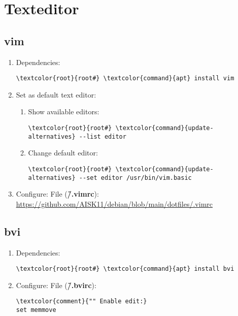 \documentclass[10pt, a4paper, onecolumn, openany]{book} %
\begin{document}
\section{Texteditor}
\subsection{vim}
\begin{enumerate}
    \item Dependencies:
\begin{Verbatim}[commandchars=\\\{\}]
\textcolor{root}{root#} \textcolor{command}{apt} install vim
\end{Verbatim}
    \item Set as default text editor:
    \begin{enumerate}
        \item Show available editors:
        \begin{Verbatim}[commandchars=\\\{\}]
\textcolor{root}{root#} \textcolor{command}{update-alternatives} --list editor
\end{Verbatim}
        \item Change default editor:
\begin{Verbatim}[commandchars=\\\{\}]
\textcolor{root}{root#} \textcolor{command}{update-alternatives} --set editor /usr/bin/vim.basic
\end{Verbatim}
    \end{enumerate}
    \item Configure:
\newline File (\textbf{\textcolor{file}{\~/.vimrc}}):
\newline \underline{\url{https://github.com/AISK11/debian/blob/main/dotfiles/.vimrc}}
\end{enumerate}
\subsection{bvi}
\begin{enumerate}
    \item Dependencies:
\begin{Verbatim}[commandchars=\\\{\}]
\textcolor{root}{root#} \textcolor{command}{apt} install bvi
\end{Verbatim}
    \item Configure:
\newline File (\textbf{\textcolor{file}{\~/.bvirc}}):
\begin{Verbatim}[commandchars=\\\{\}]
\textcolor{comment}{"" Enable edit:}
set memmove
\end{Verbatim}
\end{enumerate}
\end{document}

